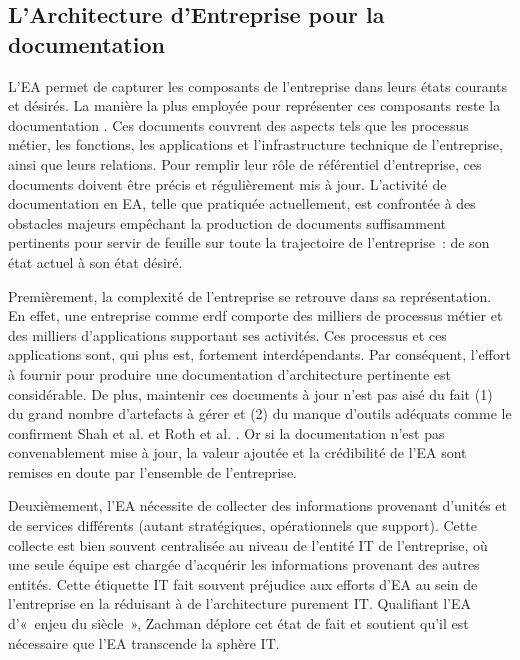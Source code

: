  \subsection{L'Architecture d'Entreprise pour la documentation}


L'EA permet de capturer les composants de l'entreprise dans
leurs états courants et désirés. La manière la plus employée pour représenter
ces composants reste la documentation \cite{barn2013enterprise}. Ces documents
couvrent des aspects tels que les processus métier, les fonctions, les
applications et l'infrastructure technique de l'entreprise, ainsi que leurs
relations. Pour remplir leur rôle de référentiel d'entreprise, ces documents
doivent être précis et régulièrement mis à jour. L'activité de documentation en
EA, telle que pratiquée actuellement, est confrontée à des obstacles majeurs
empêchant la production de documents suffisamment pertinents pour servir de
feuille sur toute la trajectoire de l'entreprise~: de son état actuel à son
état désiré.

Premièrement, la complexité de l'entreprise se retrouve dans sa
représentation. En effet, une entreprise comme \gls{erdf} comporte des milliers
de processus métier et des milliers d'applications supportant ses activités.
Ces processus et ces applications sont, qui plus est, fortement
interdépendants. Par conséquent, l'effort à fournir pour produire une
documentation d'architecture pertinente est considérable. De plus, maintenir
ces documents à jour n'est pas aisé du fait (1) du grand nombre d'artefacts à
gérer et (2) du manque d'outils adéquats comme le confirment Shah et al.
\cite{shah2007frameworks} et Roth et al. \cite{roth2013enterprise}. Or si la
documentation n'est pas convenablement mise à jour, la valeur ajoutée et la
crédibilité de l'EA sont remises en doute par l'ensemble de l'entreprise.

Deuxièmement, l'EA nécessite de collecter des informations provenant
d'unités et de services différents (autant stratégiques, opérationnels que
support). Cette collecte est bien souvent centralisée au niveau de l'entité IT
de l'entreprise, où une seule équipe est chargée d'acquérir les informations
provenant des autres entités. Cette étiquette IT fait souvent préjudice aux
efforts d'EA au sein de l'entreprise en la réduisant à de l'architecture
purement IT. Qualifiant l'EA d'«~enjeu du siècle~», Zachman déplore cet état de
fait et soutient qu'il est nécessaire que l'EA transcende la sphère IT.


